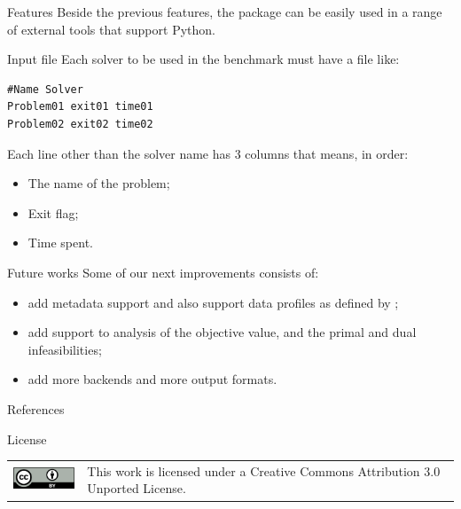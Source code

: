 \documentclass[a0paper,portrait]{baposter}
\begin{document}
\begin{poster}
\begin{posterbox}[column=1]{Features}
    Beside the previous features, the package can be easily used in a range
    of external tools that support Python.
  \end{posterbox}

  \begin{posterbox}[column=1,below=auto]{Input file}
    Each solver to be used in the benchmark must have a file like:

    \begin{lstlisting}
#Name Solver
Problem01 exit01 time01
Problem02 exit02 time02
    \end{lstlisting}

    Each line other than the solver name has 3 columns that means, in order:
    \begin{itemize}
      \item The name of the problem;
      \item Exit flag;
      \item Time spent.
    \end{itemize}
  \end{posterbox}

  \begin{posterbox}[column=1,below=auto]{Future works}
    Some of our next improvements consists of:
    \begin{itemize}
      \item add metadata support and also support data profiles as defined by
        \textcite{More2009};
      \item add support to analysis of the objective value, and the primal and
        dual infeasibilities;
      \item add more backends and more output formats.
    \end{itemize}
  \end{posterbox}

  \begin{posterbox}[column=1,below=auto]{References}
    \printbibliography[heading=none]
  \end{posterbox}

  \begin{posterbox}[column=0,span=2,below=output,height=bottom]{License}
    \begin{tabular}{cl}
      \multirow{2}{*}{\includegraphics[height=24pt]{figures/cc-by}} &
      This work is licensed under a 
       Creative Commons Attribution 3.0 Unported License.
    \end{tabular}
  \end{posterbox}
\end{poster}
\end{document}
